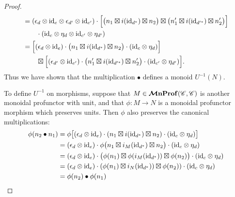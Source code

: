 \documentclass[11pt,oneside,article]{memoir}
\begin{document}
\begin{proof}
\begin{align*}
    &= (\epsilon_d\otimes\mathrm{id}_e\otimes\epsilon_{d'}\otimes\mathrm{id}_{e'})
        \cdot \Bigl[\bigl(n_1\boxtimes i(\mathrm{id}_{d^*})\boxtimes n_2\bigr)
        \boxtimes \bigl(n'_1\boxtimes i(\mathrm{id}_{d'^*})\boxtimes n'_2\bigr)\Bigr] \\
    &\qquad \cdot(\mathrm{id}_c\otimes\eta_d\otimes\mathrm{id}_{c'}\otimes\eta_{d'}) \\
    &= \Bigl[(\epsilon_d\otimes\mathrm{id}_e)
        \cdot \bigl(n_1\boxtimes i(\mathrm{id}_{d^*})\boxtimes n_2\bigr)
        \cdot (\mathrm{id}_c\otimes\eta_d)\Bigr] \\
    &\qquad \boxtimes \Bigl[(\epsilon_{d'}\otimes\mathrm{id}_{e'})
        \cdot \bigl(n'_1\boxtimes i(\mathrm{id}_{d'^*})\boxtimes n'_2\bigr)
        \cdot (\mathrm{id}_{c'}\otimes\eta_{d'})\Bigr].
  \end{align*}
  Thus we have shown that the multiplication $\bullet$ defines a monoid $U^{-1}(N)$.

  To define $U^{-1}$ on morphisms, suppose that $M\in\bm{\mathcal{M}}\mathbf{nProf}(\mathscr{C}, \mathscr{C})$ is another monoidal
  profunctor with unit, and that $\phi\colon M\to N$ is a monoidal profunctor morphism which
  preserves units. Then $\phi$ also preserves the canonical multiplications:
  \begin{align*}
    \phi(n_2\bullet n_1) &=
    \phi\bigl[(\epsilon_d\otimes\mathrm{id}_e)\cdot(n_1\boxtimes i(\mathrm{id}_{d^*})\boxtimes n_2)
       \cdot(\mathrm{id}_c\otimes \eta_d)\bigr] \\
    &= (\epsilon_d\otimes\mathrm{id}_e)\cdot\phi\bigl(n_1\boxtimes i_M(\mathrm{id}_{d^*})\boxtimes n_2\bigr)
       \cdot(\mathrm{id}_c\otimes \eta_d) \\
    &= (\epsilon_d\otimes\mathrm{id}_e)
       \cdot\bigl(\phi(n_1)\boxtimes \phi(i_M(\mathrm{id}_{d^*}))\boxtimes \phi(n_2)\bigr)
       \cdot(\mathrm{id}_c\otimes \eta_d) \\
    &= (\epsilon_d\otimes\mathrm{id}_e)
       \cdot(\phi(n_1)\boxtimes i_N(\mathrm{id}_{d^*}))\boxtimes \phi(n_2))
       \cdot(\mathrm{id}_c\otimes \eta_d) \\
    &= \phi(n_2)\bullet\phi(n_1)
  \end{align*}


\end{proof}
\end{document}

